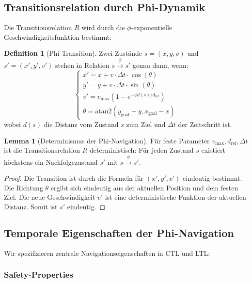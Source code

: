 ﻿\documentclass[a4paper,12pt]{article}
\theoremstyle{definition}
\newtheorem{definition}{Definition}[section]
\newtheorem{lemma}{Lemma}[section]
\begin{document}
\subsection{Transitionsrelation durch Phi-Dynamik}

Die Transitionsrelation $R$ wird durch die $\phi$-exponentielle Geschwindigkeitsfunktion bestimmt:

\begin{definition}[Phi-Transition]
Zwei Zustände $s = (x, y, v)$ und $s' = (x', y', v')$ stehen in Relation $s \xrightarrow{\phi} s'$ genau dann, wenn:
\[
\begin{cases}
x' = x + v \cdot \Delta t \cdot \cos(\theta) \\
y' = y + v \cdot \Delta t \cdot \sin(\theta) \\
v' = v_{\max}(1 - e^{-\phi d(s)/d_{\text{ref}}}) \\
\theta = \text{atan2}(y_{\text{goal}} - y, x_{\text{goal}} - x)
\end{cases}
\]
wobei $d(s)$ die Distanz vom Zustand $s$ zum Ziel und $\Delta t$ der Zeitschritt ist.
\end{definition}

\begin{lemma}[Determinismus der Phi-Navigation]
Für feste Parameter $v_{\max}, d_{\text{ref}}, \Delta t$ ist die Transitionsrelation $R$ deterministisch: Für jeden Zustand $s$ existiert höchstens ein Nachfolgezustand $s'$ mit $s \xrightarrow{\phi} s'$.
\end{lemma}

\begin{proof}
Die Transition ist durch die Formeln für $(x', y', v')$ eindeutig bestimmt. Die Richtung $\theta$ ergibt sich eindeutig aus der aktuellen Position und dem festen Ziel. Die neue Geschwindigkeit $v'$ ist eine deterministische Funktion der aktuellen Distanz. Somit ist $s'$ eindeutig.
\end{proof}

\subsection{Temporale Eigenschaften der Phi-Navigation}

Wir spezifizieren zentrale Navigationseigenschaften in CTL und LTL:

\subsubsection{Safety-Properties}
\end{document}
